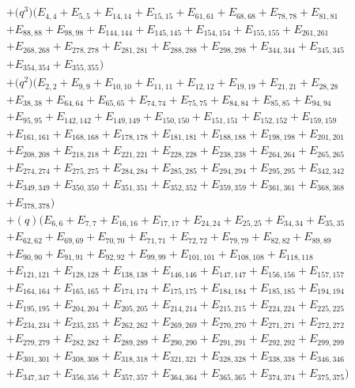 \documentclass[pdftex]{sigma}
\numberwithin{equation}{section}
\theoremstyle{definition}
\begin{document}
\begin{align*}
&+\bigl(q^3\bigr)(E_{4,4}+E_{5,5}+E_{14,14}+E_{15,15}+E_{61,61}+E_{68,68}+E_{78,78}+E_{81,81}\\
&+E_{88,88}+E_{98,98}+E_{144,144}+E_{145,145}+E_{154,154}+E_{155,155}+E_{261,261}\\
&+E_{268,268}+E_{278,278}+E_{281,281}+E_{288,288}+E_{298,298}+E_{344,344}+E_{345,345}\\
&+E_{354,354}+E_{355,355})\\
&+\bigl(q^2\bigr)(E_{2,2}+E_{9,9}+E_{10,10}+E_{11,11}+E_{12,12}+E_{19,19}+E_{21,21}+E_{28,28}\\
&+E_{38,38}+E_{64,64}+E_{65,65}+E_{74,74}+E_{75,75}+E_{84,84}+E_{85,85}+E_{94,94}\\
&+E_{95,95}+E_{142,142}+E_{149,149}+E_{150,150}+E_{151,151}+E_{152,152}+E_{159,159}\\
&+E_{161,161}+E_{168,168}+E_{178,178}+E_{181,181}+E_{188,188}+E_{198,198}+E_{201,201}\\
&+E_{208,208}+E_{218,218}+E_{221,221}+E_{228,228}+E_{238,238}+E_{264,264}+E_{265,265}\\
&+E_{274,274}+E_{275,275}+E_{284,284}+E_{285,285}+E_{294,294}+E_{295,295}+E_{342,342}\\
&+E_{349,349}+E_{350,350}+E_{351,351}+E_{352,352}+E_{359,359}+E_{361,361}+E_{368,368}\\
&+E_{378,378})\\
&+(q)(E_{6,6}+E_{7,7}+E_{16,16}+E_{17,17}+E_{24,24}+E_{25,25}+E_{34,34}+E_{35,35}\\
&+E_{62,62}+E_{69,69}+E_{70,70}+E_{71,71}+E_{72,72}+E_{79,79}+E_{82,82}+E_{89,89}\\
&+E_{90,90}+E_{91,91}+E_{92,92}+E_{99,99}+E_{101,101}+E_{108,108}+E_{118,118}\\
&+E_{121,121}+E_{128,128}+E_{138,138}+E_{146,146}+E_{147,147}+E_{156,156}+E_{157,157}\\
&+E_{164,164}+E_{165,165}+E_{174,174}+E_{175,175}+E_{184,184}+E_{185,185}+E_{194,194}\\
&+E_{195,195}+E_{204,204}+E_{205,205}+E_{214,214}+E_{215,215}+E_{224,224}+E_{225,225}\\
&+E_{234,234}+E_{235,235}+E_{262,262}+E_{269,269}+E_{270,270}+E_{271,271}+E_{272,272}\\
&+E_{279,279}+E_{282,282}+E_{289,289}+E_{290,290}+E_{291,291}+E_{292,292}+E_{299,299}\\
&+E_{301,301}+E_{308,308}+E_{318,318}+E_{321,321}+E_{328,328}+E_{338,338}+E_{346,346}\\
&+E_{347,347}+E_{356,356}+E_{357,357}+E_{364,364}+E_{365,365}+E_{374,374}+E_{375,375})\\

\end{align*}
\end{document}
